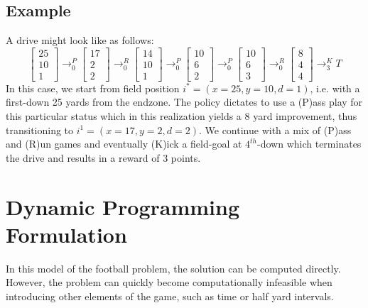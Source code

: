 \documentclass[11pt, oneside]{article}   	%
\begin{document}
\subsection{Example}
A drive might look like as follows:
$$
\begin{bmatrix} 25\\[0.3em] 10 \\[0.3em] 1 \end{bmatrix}
\longrightarrow_0^P
\begin{bmatrix} 17\\[0.3em] 2 \\[0.3em] 2 \end{bmatrix}
\longrightarrow_0^R
\begin{bmatrix} 14\\[0.3em] 10 \\[0.3em] 1 \end{bmatrix}
\longrightarrow_0^P
\begin{bmatrix} 10\\[0.3em] 6 \\[0.3em] 2 \end{bmatrix}
\longrightarrow_0^P
\begin{bmatrix} 10\\[0.3em] 6 \\[0.3em] 3 \end{bmatrix}
\longrightarrow_0^R
\begin{bmatrix} 8\\[0.3em] 4 \\[0.3em] 4 \end{bmatrix}
\longrightarrow_3^K
T
$$
In this case, we start from field position $i^* = (x=25, y=10, d=1)$, i.e. with a first-down 25 yards from the endzone. The policy dictates to use a (P)ass play for this particular status which in this realization yields a 8 yard improvement, thus transitioning to $i^1 = (x=17, y=2, d=2)$. We continue with a mix of (P)ass and (R)un games and eventually (K)ick a field-goal at $4^{th}$-down which terminates the drive and results in a reward of 3 points.


\newpage
\section{Dynamic Programming Formulation}
In this model of the football problem, the solution can be computed directly. However, the problem can quickly become computationally infeasible when introducing other elements of the game, such as time or half yard intervals.
\end{document}
